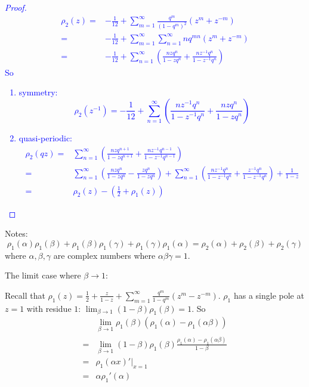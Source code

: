 \documentclass{article}
\begin{document}
\textcolor{blue}{
\begin{proof}
\begin{align*}
 \rho_2(z) = & -\frac{1}{12} + \sum\limits_{m=1}^{\infty} \frac{q^m}{(1-q^m)^2} (z^m + z^{-m})\\
 = & -\frac{1}{12} + \sum\limits_{m=1}^{\infty}\sum\limits_{n=1}^{\infty} nq^{mn} (z^m + z^{-m})\\
 = & -\frac{1}{12} + \sum\limits_{n=1}^{\infty} \left( \frac{nzq^n}{1-zq^n} + \frac{nz^{-1}q^n}{1-z^{-1}q^n} \right)
\end{align*}
So 
\begin{enumerate}
\item symmetry:
\begin{equation*}
\rho_2(z^{-1}) = -\frac{1}{12} + \sum\limits_{n=1}^{\infty} \left( \frac{nz^{-1}q^n}{1-z^{-1}q^n} + \frac{nzq^n}{1-zq^n} \right)
\end{equation*}
\item quasi-periodic:  
\begin{align*}
 \rho_2(qz)= & \sum\limits_{n=1}^{\infty} \left( \frac{nzq^{n+1}}{1-zq^{n+1}} + \frac{nz^{-1}q^{n-1}}{1-z^{-1}q^{n-1}} \right)\\
 = & \sum\limits_{n=1}^{\infty}\left( \frac{nzq^n}{1-zq^n} - \frac{zq^n}{1-zq^n}  \right) + \sum\limits_{n=1}^{\infty} \left( \frac{nz^{-1}q^n}{1-z^{-1}q^n} + \frac{z^{-1}q^n}{1-z^{-1}q^n} \right) + \frac{1}{1-z}\\
 =& \rho_2(z) - ( \frac{1}{2} + \rho_1(z))
\end{align*}
\end{enumerate}
\end{proof}
}


Notes:
\begin{equation}
 \label{eq:1.note}
\rho_1(\alpha)\rho_1(\beta)+\rho_1(\beta)\rho_1(\gamma)+ \rho_1(\gamma)\rho_1(\alpha)= \rho_2(\alpha)+ \rho_2(\beta)+\rho_2(\gamma)
\end{equation}
where $\alpha,\beta,\gamma$ are complex numbers where $\alpha\beta\gamma=1$.


The limit case where $\beta\to 1$:

 Recall that $\rho_1(z)= \frac{1}{2} + \frac{z}{1-z} + \sum\limits_{m=1}^{\infty} \frac{q^m}{1-q^m}(z^m-z^{-m})$. $\rho_1$ has a single pole at $z=1$ with residue $1$: $\lim_{\beta\to 1}(1-\beta)\rho_1(\beta)=1$. So
\begin{align*}
 &\lim_{\beta\to 1}\rho_1(\beta)(\rho_1(\alpha)-\rho_1(\alpha\beta))\\
 =& \lim\limits_{\beta\to 1}  (1-\beta)\rho_1(\beta) \frac{\rho_1(\alpha)- \rho_1(\alpha\beta)}{1-\beta}\\
 =& \rho_1(\alpha x)'|_{x=1}\\
 =& \alpha\rho_1'(\alpha)
\end{align*}
\end{document}
